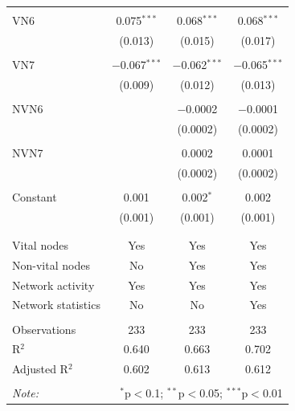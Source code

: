\begin{table}[!htbp]
\begin{tabular}{@{\extracolsep{5pt}}lccc}
  & & & \\ 
 VN6 & 0.075$^{***}$ & 0.068$^{***}$ & 0.068$^{***}$ \\ 
  & (0.013) & (0.015) & (0.017) \\ 
  & & & \\ 
 VN7 & $-$0.067$^{***}$ & $-$0.062$^{***}$ & $-$0.065$^{***}$ \\ 
  & (0.009) & (0.012) & (0.013) \\ 
  & & & \\ 
 NVN6 &  & $-$0.0002 & $-$0.0001 \\ 
  &  & (0.0002) & (0.0002) \\ 
  & & & \\ 
 NVN7 &  & 0.0002 & 0.0001 \\ 
  &  & (0.0002) & (0.0002) \\ 
  & & & \\ 
 Constant & 0.001 & 0.002$^{*}$ & 0.002 \\ 
  & (0.001) & (0.001) & (0.001) \\ 
  & & & \\ 
\hline \\[-1.8ex] 
Vital nodes & Yes & Yes & Yes \\ 
Non-vital nodes & No & Yes & Yes \\ 
Network activity & Yes & Yes & Yes \\ 
Network statistics & No & No & Yes \\ 
\hline &  &  &  \\ 
Observations & 233 & 233 & 233 \\ 
R$^{2}$ & 0.640 & 0.663 & 0.702 \\ 
Adjusted R$^{2}$ & 0.602 & 0.613 & 0.612 \\ 
\hline 
\hline \\[-1.8ex] 
\textit{Note:}  & \multicolumn{3}{r}{$^{*}$p$<$0.1; $^{**}$p$<$0.05; $^{***}$p$<$0.01} \\ 
\end{tabular} 
\end{table} 
